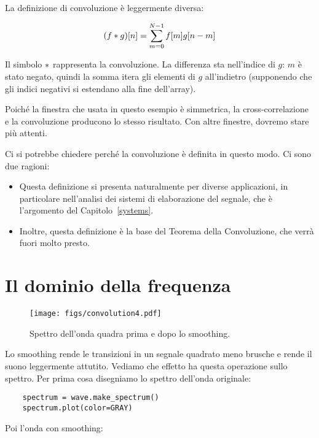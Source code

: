 \documentclass[12pt,a4paper]{book}
\begin{document}
La definizione di convoluzione è leggermente diversa:

%
\[ (f \ast g)[n] = \sum_{m=0}^{N-1} f[m] g[n-m] \] 

%
Il simbolo $\ast$ rappresenta la convoluzione. La differenza sta nell'indice di $g$: $m$ è stato negato, quindi la somma itera gli elementi di $g$ all'indietro (supponendo che gli indici negativi si estendano alla fine dell'array).

Poiché la finestra che usata in questo esempio è simmetrica, la cross-correlazione e la convoluzione producono lo stesso risultato. Con altre finestre, dovremo stare più attenti.

Ci si potrebbe chiedere perché la convoluzione è definita in questo modo. Ci sono due ragioni:

\begin{itemize} 

\item Questa definizione si presenta naturalmente per diverse applicazioni, in particolare nell'analisi dei sistemi di elaborazione del segnale, che è l'argomento del Capitolo~\ref{systems}.

\item Inoltre, questa definizione è la base del Teorema della Convoluzione, che verrà fuori molto presto.

\end{itemize} 

\section{Il dominio della frequenza} 

\begin{figure} 

\centerline{\texttt{[image: figs/convolution4.pdf]}} \caption{Spettro dell'onda quadra prima e dopo lo smoothing.} \label{fig.convolution4} \end{figure} 

Lo smoothing rende le transizioni in un segnale quadrato meno brusche e rende il suono leggermente attutito. Vediamo che effetto ha questa operazione sullo spettro. Per prima cosa disegniamo lo spettro dell'onda originale:

\begin{verbatim} 
    spectrum = wave.make_spectrum()
    spectrum.plot(color=GRAY)
 \end{verbatim} 

Poi l'onda con smoothing:
\end{document}
